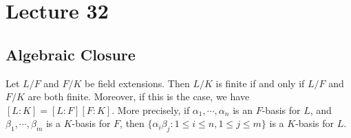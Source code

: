 \section{Lecture 32}
\subsection{Algebraic Closure}
\begin{theorem}
  Let $L/F$ and $F/K$ be field extensions. Then $L/K$ is finite if and only if $L/F$ and
  $F/K$ are both finite. Moreover, if this is the case, we have $[L:K]=[L:F][F:K]$. More
  precisely, if $\alpha_1,\cdots, \alpha_n$ is an $F$-basis for $L$, and $\beta_1,\cdots,
  \beta_m$ is a $K$-basis for $F$, then $\{\alpha_i\beta_j : 1\leq i\leq n, 1\leq j\leq
  m\}$ is a $K$-basis for $L$.
  \label{meow2}
\end{theorem}
